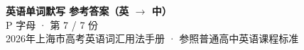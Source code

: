 \documentclass[10pt,a4paper]{article}
\begin{document}
\pagestyle{plain}

\begin{center}
{\LARGE\bfseries 英语单词默写 \quad 参考答案（英 $\to$ 中）}\\[0.22em]
{\large P 字母 · 第 7 / 7 份}\\[0.18em]
{\small 2026年上海市高考英语词汇用法手册 · 参照普通高中英语课程标准}
\end{center}

\vspace{0.2em}
\noindent{\color{rulegray}\rule{\textwidth}{0.8pt}}

\vspace{0.35em}

\vspace{0.25em}
\renewcommand{\arraystretch}{1.32}
\end{document}
